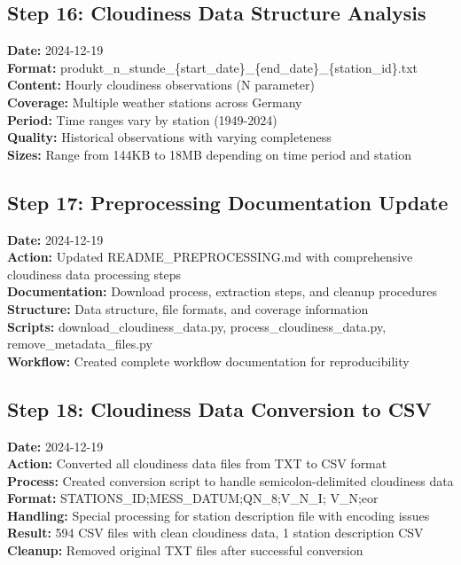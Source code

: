 \documentclass[11pt,a4paper]{article}
\begin{document}
\subsection{Step 16: Cloudiness Data Structure Analysis}
\textbf{Date:} 2024-12-19\\
\textbf{Format:} produkt\_n\_stunde\_\{start\_date\}\_\{end\_date\}\_\{station\_id\}.txt\\
\textbf{Content:} Hourly cloudiness observations (N parameter)\\
\textbf{Coverage:} Multiple weather stations across Germany\\
\textbf{Period:} Time ranges vary by station (1949-2024)\\
\textbf{Quality:} Historical observations with varying completeness\\
\textbf{Sizes:} Range from 144KB to 18MB depending on time period and station

\subsection{Step 17: Preprocessing Documentation Update}
\textbf{Date:} 2024-12-19\\
\textbf{Action:} Updated README\_PREPROCESSING.md with comprehensive cloudiness data processing steps\\
\textbf{Documentation:} Download process, extraction steps, and cleanup procedures\\
\textbf{Structure:} Data structure, file formats, and coverage information\\
\textbf{Scripts:} download\_cloudiness\_data.py, process\_cloudiness\_data.py, remove\_metadata\_files.py\\
\textbf{Workflow:} Created complete workflow documentation for reproducibility

\subsection{Step 18: Cloudiness Data Conversion to CSV}
\textbf{Date:} 2024-12-19\\
\textbf{Action:} Converted all cloudiness data files from TXT to CSV format\\
\textbf{Process:} Created conversion script to handle semicolon-delimited cloudiness data\\
\textbf{Format:} STATIONS\_ID;MESS\_DATUM;QN\_8;V\_N\_I; V\_N;eor\\
\textbf{Handling:} Special processing for station description file with encoding issues\\
\textbf{Result:} 594 CSV files with clean cloudiness data, 1 station description CSV\\
\textbf{Cleanup:} Removed original TXT files after successful conversion
\end{document}
